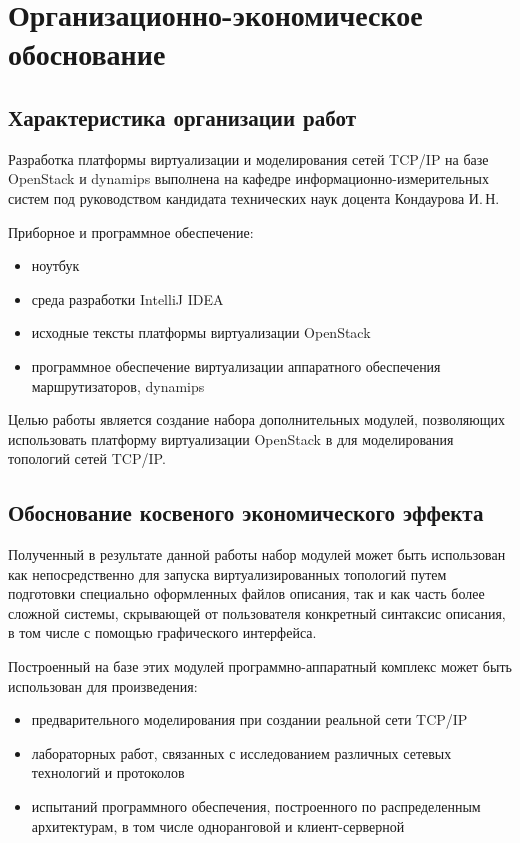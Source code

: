 \chapter{Организационно-экономическое обоснование}

\section{Характеристика организации работ}

Разработка платформы виртуализации и моделирования сетей TCP/IP на базе OpenStack и dynamips выполнена на кафедре информационно-измерительных систем под руководством кандидата технических наук доцента Кондаурова И.\,Н. 

Приборное и программное обеспечение:
\begin{itemize}
    \item ноутбук
    \item среда разработки IntelliJ IDEA
    \item исходные тексты платформы виртуализации OpenStack
    \item программное обеспечение виртуализации аппаратного обеспечения маршрутизаторов, dynamips
\end{itemize}

Целью работы является создание набора дополнительных модулей, позволяющих использовать
платформу виртуализации OpenStack в для моделирования топологий сетей TCP/IP.

\section{Обоснование косвеного экономического эффекта}

Полученный в результате данной работы набор модулей может быть использован как 
непосредственно для запуска виртуализированных топологий путем подготовки специально
оформленных файлов описания, так и как часть более сложной системы, скрывающей от
пользователя конкретный синтаксис описания, в том числе с помощью графического 
интерфейса.

Построенный на базе этих модулей программно-аппаратный комплекс может быть использован
для произведения:
\begin{itemize}
    \item предварительного моделирования при создании реальной сети TCP/IP
    \item лабораторных работ, связанных с исследованием различных сетевых технологий и протоколов
    \item испытаний программного обеспечения, построенного по распределенным архитектурам, в том числе одноранговой и клиент-серверной
\end{itemize}

